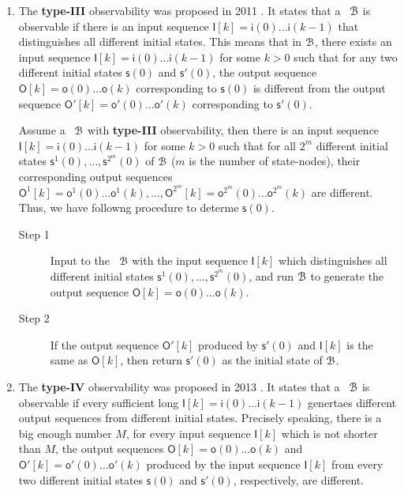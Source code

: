 \begin{enumerate}
\item The  {\bf type-III} observability was proposed in 2011 \cite{Cheng2011Identification}.  It states that a \BCN\ ${\mathcal{B}}$ is observable if there is an input sequence $\mathsf{I}[k]=\mathsf{i}(0)\ldots\mathsf{i}(k-1)$ that distinguishes all different initial states. This means that in ${\mathcal{B}}$, there exists an input sequence  $\mathsf{I}[k]=\mathsf{i}(0)\ldots\mathsf{i}(k-1)$ for some $k>0$ such that for any two different initial states $\mathsf{s}(0)$ and $\mathsf{s}'(0)$, the output sequence $\mathsf{O}[k]=\mathsf{o}(0)\ldots\mathsf{o}(k)$  corresponding to  $\mathsf{s}(0)$  is different from the output sequence  $\mathsf{O}'[k]=\mathsf{o}'(0)\ldots\mathsf{o}'(k)$ corresponding to $\mathsf{s}'(0)$.

Assume a \BCN\ ${\mathcal{B}}$  with {\bf type-III}  observability, then there is an input sequence $\mathsf{I}[k]=\mathsf{i}(0)\ldots\mathsf{i}(k-1)$ for some $k>0$ such that for all ${2^m}$ different initial states $\mathsf{s}^1(0),\ldots, \mathsf{s}^{2^m}(0)$ of ${\mathcal{B}}$ ($m$ is the number of state-nodes), their corresponding output sequences $\mathsf{O}^1[k]=\mathsf{o}^1(0)\ldots\mathsf{o}^1(k),\ldots, \mathsf{O}^{2^m}[k]=\mathsf{o}^{2^m}(0)\ldots\mathsf{o}^{2^m}(k)$ are different. Thus, we have followng procedure to determe $\mathsf{s}(0)$.

 \begin{description}
	\item[Step 1]  Input to the \BCN\ ${\mathcal{B}}$ with the input sequence $\mathsf{I}[k]$ which distinguishes all different initial states $\mathsf{s}^1(0),\ldots, \mathsf{s}^{2^m}(0)$, and run ${\mathcal{B}}$ to generate the output sequence $\mathsf{O}[k]=\mathsf{o}(0)\ldots\mathsf{o}(k)$.
	\item[Step 2]  If the output sequence $\mathsf{O}'[k]$ produced by $\mathsf{s}'(0)$ and $\mathsf{I}[k]$ is the same as $\mathsf{O}[k]$, then return $\mathsf{s}'(0)$ as the initial state of ${\mathcal{B}}$.
\end{description}
	
\item  The  {\bf type-IV}  observability was  proposed in 2013 \cite{Fornasini2013Observability}. It states that a \BCN\ ${\mathcal{B}}$ is observable if every sufficient long $\mathsf{I}[k]=\mathsf{i}(0)\ldots\mathsf{i}(k-1)$ genertaes different output sequences  from different initial states. Precisely speaking, there is a big enough number $M$, for every  input sequence $\mathsf{I}[k]$ which is not shorter than $M$, the output sequences $\mathsf{O}[k]=\mathsf{o}(0) \ldots\mathsf{o}(k)$ and  $\mathsf{O}'[k]=\mathsf{o}'(0)\ldots\mathsf{o}'(k)$ produced by the input sequence $\mathsf{I}[k]$ from every two different initial states $\mathsf{s}(0)$ and $\mathsf{s}'(0)$, respectively, are different.


\end{enumerate}
